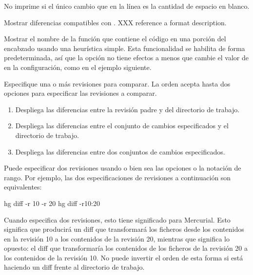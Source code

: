 
No imprime si el único cambio que en la línea es la cantidad de
espacio en blanco.


Mostrar diferencias compatibles con .  XXX reference a format
description.


Mostrar el nombre de la función que contiene el código en una porción
del encabzado usando una heurística simple.  Esta funcionalidad se
habilita de forma predeterminada, así que la opción 
no tiene efectos a menos que cambie el valor de
 en la configuración, como en el ejemplo
siguiente.


Especifique una o más revisiones para comparar.  La orden 
acepta hasta dos opciones  para especificar las
revisiones a comparar.

\begin{enumerate}
\setcounter{enumi}{0}
\item Despliega las diferencias entre la revisión padre y del directorio
  de trabajo.
\item Despliega las diferencias entre el conjunto de cambios
  especificados y el directorio de trabajo.
\item Despliega las diferencias entre dos conjuntos de cambios
  especificados.
\end{enumerate}

Puede especificar dos revisiones usando o bien sea las opciones
 o la notación de rango.  Por ejemplo, las dos
especificaciones de revisiones a continuación son equivalentes:
\begin{codesample2}
  hg diff -r 10 -r 20
  hg diff -r10:20
\end{codesample2}

Cuando especifica dos revisiones, esto tiene significado para
Mercurial.  Esto significa que  producirá un
diff que transformará los ficheros desde los contenidos en la revisión
10 a los contenidos de la revisión 20, mientras que
 significa lo opuesto:  el diff que
transformaría los contenidos de los ficheros de la revisión 20 a los
contenidos de la revisión 10.  No puede invertir el orden de esta
forma si está haciendo un diff frente al directorio de trabajo.

